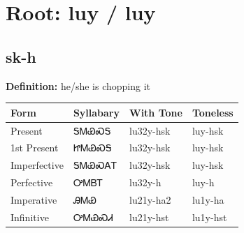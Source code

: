 \documentclass{article}%
\begin{document}
%
\normalsize%
\section*{Root: luy / luy}%
\subsection*{sk-h}%
\textbf{Definition: }%
he/she is chopping it%
\\[0.5em]%
\begin{tabular}{|l|l|l|l|}%
\hline%
\textbf{Form}&\textbf{Syllabary}&\textbf{With Tone}&\textbf{Toneless}\\%
\hline%
Present&ᎦᎷᏯᏍᎦ&lu32y{-}hsk&luy{-}hsk\\%
1st Present&ᏥᎷᏯᏍᎦ&lu32y{-}hsk&luy{-}hsk\\%
Imperfective&ᎦᎷᏯᏍᎪᎢ&lu32y{-}hsk&luy{-}hsk\\%
Perfective&ᎤᎷᏴᎢ&lu32y{-}h&luy{-}h\\%
Imperative&ᎯᎷᏯ&lu21y{-}ha2&lu1y{-}ha\\%
Infinitive&ᎤᎷᏯᏍᏗ&lu21y{-}hst&lu1y{-}hst\\%
\hline%
\end{tabular}%
\\[1em]%
\end{document}
